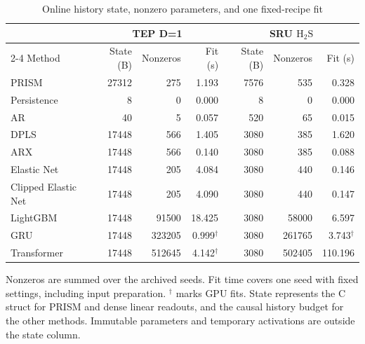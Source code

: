 \begin{table}[!t]
\centering
\caption{Online history state, nonzero parameters, and one fixed-recipe fit}
\label{tab:deployment-inventory}
\small\setlength{\tabcolsep}{4pt}
\begin{tabular}{lrrrrrr}
\hline
& \multicolumn{3}{c}{TEP D=1} & \multicolumn{3}{c}{SRU $\mathrm{H_2S}$} \\
\cline{2-4}\cline{5-7}
Method & State (B) & Nonzeros & Fit (s) & State (B) & Nonzeros & Fit (s) \\
\hline
PRISM & 27312 & 275 & 1.193 & 7576 & 535 & 0.328 \\
Persistence & 8 & 0 & 0.000 & 8 & 0 & 0.000 \\
AR & 40 & 5 & 0.057 & 520 & 65 & 0.015 \\
DPLS & 17448 & 566 & 1.405 & 3080 & 385 & 1.620 \\
ARX & 17448 & 566 & 0.140 & 3080 & 385 & 0.088 \\
Elastic Net & 17448 & 205 & 4.084 & 3080 & 440 & 0.146 \\
Clipped Elastic Net & 17448 & 205 & 4.090 & 3080 & 440 & 0.147 \\
LightGBM & 17448 & 91500 & 18.425 & 3080 & 58000 & 6.597 \\
GRU & 17448 & 323205 & 0.999$^\dagger$ & 3080 & 261765 & 3.743$^\dagger$ \\
Transformer & 17448 & 512645 & 4.142$^\dagger$ & 3080 & 502405 & 110.196 \\
\hline
\end{tabular}
\par\smallskip
\parbox{0.96\textwidth}{\footnotesize Nonzeros are summed over the archived seeds. Fit time covers one seed with fixed settings, including input preparation. $^\dagger$ marks GPU fits. State represents the C struct for PRISM and dense linear readouts, and the causal history budget for the other methods. Immutable parameters and temporary activations are outside the state column.}
\end{table}

